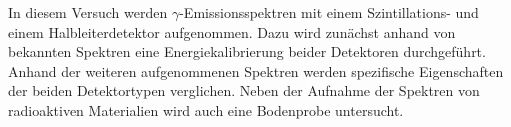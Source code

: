 In diesem Versuch werden $\gamma$-Emissionsspektren mit einem Szintillations- und einem Halbleiterdetektor aufgenommen. Dazu wird zunächst anhand von bekannten Spektren eine Energiekalibrierung beider Detektoren durchgeführt. Anhand der weiteren aufgenommenen Spektren werden spezifische Eigenschaften der beiden Detektortypen verglichen. Neben der Aufnahme der Spektren von radioaktiven Materialien wird auch eine Bodenprobe untersucht.
